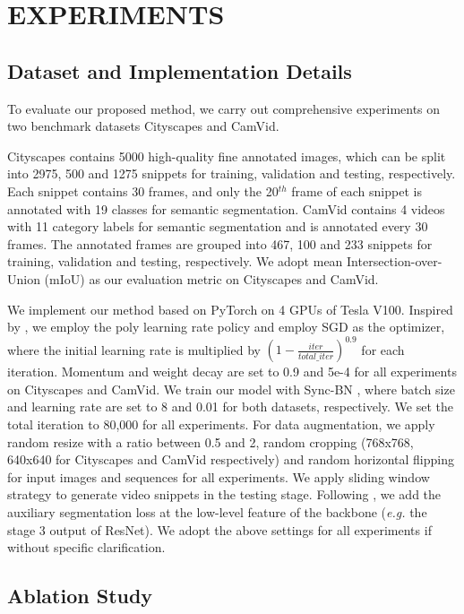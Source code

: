 \documentclass{article}
\begin{document}
	\section{EXPERIMENTS}
	\label{sec:experiments}
	\subsection{Dataset and Implementation Details}
	\label{ssec:dataset and implementation}
	To evaluate our proposed method, we carry out comprehensive experiments on two benchmark datasets Cityscapes\cite{Cityscapes} and CamVid\cite{Camvid}.
	
	Cityscapes \cite{Cityscapes} contains 5000 high-quality fine annotated images, which can be split into 2975, 500 and 1275 snippets for training, validation and testing, respectively. Each snippet contains 30 frames, and only the 20$^{th}$ frame of each snippet is annotated with 19 classes for semantic segmentation. CamVid \cite{Camvid} contains 4 videos with 11 category labels for semantic segmentation and is annotated every 30 frames. The annotated frames are grouped into 467, 100 and 233 snippets for training, validation and testing, respectively. We adopt mean Intersection-over-Union (mIoU) as our evaluation metric on Cityscapes and CamVid.
	
	We implement our method based on PyTorch on 4 GPUs of Tesla V100. Inspired by \cite{deeplab2017}, we employ the poly learning rate policy and employ SGD as the optimizer, where the initial learning rate is multiplied by $(1 - \frac{iter}{total\_iter})^{0.9}$ for each iteration. 
	Momentum and weight decay are set to 0.9 and 5e-4  for all experiments on Cityscapes and CamVid. 
	We train our model with Sync-BN \cite{encoding2018}, where batch size and learning rate are set to 8 and 0.01 for both datasets, respectively. 
	We set the total iteration to 80,000 for all experiments. For data augmentation, we apply random resize with a ratio between 0.5 and 2, random cropping (768x768, 640x640 for Cityscapes and CamVid respectively) and random horizontal flipping for input images and sequences for all experiments. We apply sliding window strategy to generate video snippets in the testing stage. Following \cite{PSPNet2017}, we add the auxiliary segmentation loss at the low-level feature of the backbone (\emph{e.g.} the stage 3 output of ResNet). We adopt the above settings for all experiments if without specific clarification.
	
	\subsection{Ablation Study}
	\label{ssec:ablations}
	
\end{document}
